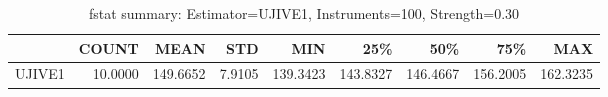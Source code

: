 \begin{table}[ht]
\centering
\caption{fstat summary: Estimator=UJIVE1, Instruments=100, Strength=0.30}
\begin{tabular}{lrrrrrrrr}
\toprule
 & COUNT & MEAN & STD & MIN & 25\% & 50\% & 75\% & MAX \\
\midrule
UJIVE1 & 10.0000 & 149.6652 & 7.9105 & 139.3423 & 143.8327 & 146.4667 & 156.2005 & 162.3235 \\
\bottomrule
\end{tabular}
\end{table}
